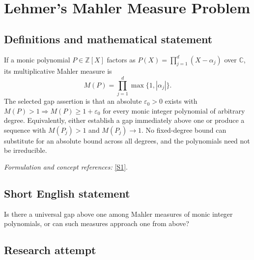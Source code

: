 \documentclass[11pt,a4paper]{article}
\newcommand{\Z}{\mathbb{Z}}
\newcommand{\C}{\mathbb{C}}
\newcommand{\eps}{\varepsilon}
\newcommand{\sref}[2]{\hyperlink{source:#1:#2}{[S#2]}}
\newif\ifshowcatalogue
\newcommand{\cataloguescope}[1]{\ifshowcatalogue
 \paragraph{Exact scope in the supplied catalogue.}
 \begin{quote}\small #1\end{quote}\fi}
\begin{document}
\setcounter{section}{205}
\clearpage
\section{\texorpdfstring{Lehmer's Mahler Measure Problem}{Lehmer's Mahler Measure Problem}}\label{206}
\subsection{Definitions and mathematical statement}
If a monic polynomial $P\in\Z[X]$ factors as
$P(X)=\prod_{j=1}^d(X-\alpha_j)$ over $\C$, its multiplicative Mahler measure is
\[
 M(P)=\prod_{j=1}^d\max\{1,|\alpha_j|\}.
\]
The selected gap assertion is that an absolute $\eps_0>0$ exists with
$M(P)>1\Longrightarrow M(P)\ge1+\eps_0$ for every monic integer polynomial of arbitrary degree. Equivalently, either establish a gap immediately above one or produce a sequence with $M(P_j)>1$ and $M(P_j)\to1$. No fixed-degree bound can substitute for an absolute bound across all degrees, and the polynomials need not be irreducible.
\par\smallskip\textit{Formulation and concept references:} \sref{206}{1}.
\cataloguescope{Prove that there exists an absolute epsilon > 0 such that every monic integer polynomial P with Mahler measure M(P) > 1 satisfies M(P) >= 1 + epsilon, or construct a sequence of such polynomials whose Mahler measures decrease to 1.}
\subsection{Short English statement}
Is there a universal gap above one among Mahler measures of monic integer polynomials, or can such measures approach one from above?
\subsection{Research attempt}
\end{document}
